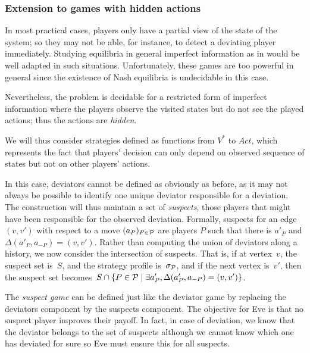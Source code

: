 \subsubsection{Extension to games with hidden actions}
\label{13-subsec:extension-to-games-with-hidden-actions}
In most practical cases, players only have a partial view of the
state of the system; so they may not be able, for instance, to
detect a deviating player immediately.
Studying equilibria in general imperfect information as in  
would be well adapted in such situations.
Unfortunately, these games are too powerful in general since
the existence of Nash equilibria is undecidable in this case.

Nevertheless, the problem is decidable for a restricted form of imperfect
information where the players observe the visited states
but do not see the played actions; thus the actions are \emph{hidden}.

We will thus consider strategies defined as functions from \(V^*\) to \(Act\),
which represents the fact that players' decision can only depend on observed
sequence of states but not on other players' actions.

In this case, deviators cannot be defined as obviously as before, as it may
not always be possible to identify one unique deviator responsible for a
deviation. The construction will thus maintain a set of \emph{suspects}, those players that might have been
responsible for the observed deviation.
Formally, suspects for an edge \((v, v')\) with respect to a move
\((a_P)_{P\in \mathcal{P}}\) are players \(P\) such that there is \(a'_P\) and
\(\Delta(a'_P, a_{-P}) = (v, v')\). Rather than computing the
union of deviators along a history, we now consider the intersection of
suspects. That is, if at vertex~$v$, the suspect set is~$S$, and the strategy profile is~$\sigma_{\mathcal{P}}$,
and if the next vertex is~$v'$, then
the suspect set becomes~$S \cap \{ P \in \mathcal{P} \mid \exists a'_P, \Delta(a'_P, a_{-P}) = (v, v')\}$.


The \emph{suspect game} can be defined just like the deviator game by replacing the deviators component
by the suspects component.
The objective for Eve is that no suspect player improves their payoff. In fact, in
case of deviation, we know that the deviator belongs to the set of suspects although
we cannot know which one has deviated for sure so Eve must ensure this for all suspects.


